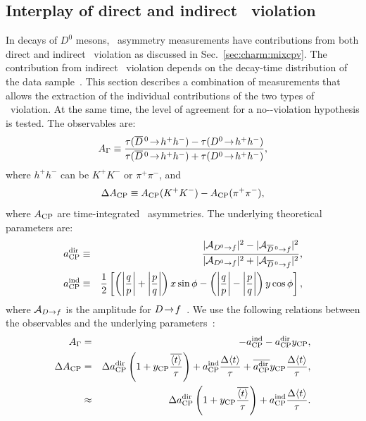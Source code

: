 \subsection{Interplay of direct and indirect \cp\ violation}
\label{sec:charm:cpvdir}

In decays of $D^0$ mesons, \cp\ asymmetry measurements have contributions from 
both direct and indirect \cp\ violation as discussed in Sec.~\ref{sec:charm:mixcpv}.
The contribution from indirect \cp\ violation depends on the decay-time distribution 
of the data sample~\cite{Kagan:2009gb}. This section describes a combination of 
measurements that allows the extraction of the individual contributions of the 
two types of \cp\ violation.
At the same time, the level of agreement for a no-\cp-violation hypothesis is 
tested. The observables are: 
\begin{equation}
A_{\Gamma} \equiv \frac{\tau(\dbar \ra h^+ h^-) - \tau(D^0 \ra h^+ h^- )}
{\tau(\dbar \ra h^+ h^-) + \tau(D^0 \ra h^+ h^- )},
\end{equation}
where $h^+ h^-$ can be $K^+ K^-$ or $\pi^+\pi^-$, and 
\begin{equation}
\Delta A_{\rm CP}   \equiv A_{\rm CP}(K^+K^-) - A_{\rm CP}(\pi^+\pi^-),
\end{equation}
where $A_{\rm CP}$ are time-integrated \cp\ asymmetries. The underlying 
theoretical parameters are: 
\begin{eqnarray}
a_{\rm CP}^{\rm dir} & \equiv & 
\frac{|{\cal A}_{D^0\rightarrow f} |^2 - |{\cal A}_{\overline{D}{}^{\,0}\rightarrow f} |^2} 
{|{\cal A}_{D^0\rightarrow f} |^2 + |{\cal A}_{\overline{D}{}^{\,0}\rightarrow f} |^2} ,\nonumber\\ 
a_{\rm CP}^{\rm ind}  & \equiv & \frac{1}{2} 
\left[ \left(\left|\frac{q}{p}\right| + \left|\frac{p}{q}\right|\right) x \sin \phi - 
\left(\left|\frac{q}{p}\right| - \left|\frac{p}{q}\right|\right) y \cos \phi \right] ,
\end{eqnarray}
where ${\cal A}_{D\rightarrow f}$ is the amplitude for $D\!\rightarrow\! f$~\cite{Grossman:2006jg}. 
We use the following relations 
between the observables and the underlying parameters~\cite{Gersabeck:2011xj}: 
\begin{eqnarray}
A_{\Gamma} & = & - a_{\rm CP}^{\rm ind} - a_{\rm CP}^{\rm dir} y_{\rm CP},\nonumber\\ 
\Delta A_{\rm CP} & = &  \Delta a_{\rm CP}^{\rm dir} \left(1 + y_{\rm CP} 
\frac{\overline{\langle t\rangle}}{\tau} \right)   +   
   a_{\rm CP}^{\rm ind} \frac{\Delta\langle t\rangle}{\tau}   +   
  \overline{a_{\rm CP}^{\rm dir}} y_{\rm CP} \frac{\Delta\langle t\rangle}{\tau},\\ 
& \approx & \Delta a_{\rm CP}^{\rm dir} \left(1 + y_{\rm CP} 
\frac{\overline{\langle t\rangle}}{\tau} \right)   +   a_{\rm CP}^{\rm ind} 
\frac{\Delta\langle t\rangle}{\tau}.
\end{eqnarray}
